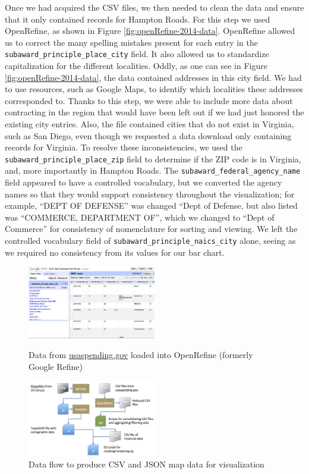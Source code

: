 \documentclass[10pt,journal,compsoc]{IEEEtran}
\begin{document}
Once we had acquired the CSV files, we then needed to clean the data and ensure that it only contained records for Hampton Roads.  For this step we used OpenRefine, as shown in Figure \ref{fig:openRefine-2014-data}.  OpenRefine allowed us to correct the many spelling mistakes present for each entry in the {\tt subaward\_principle\_place\_city} field.  It also allowed us to standardize capitalization for the different localities.  Oddly, as one can see in Figure \ref{fig:openRefine-2014-data}, the data contained addresses in this city field.  We had to use resources, such as Google Maps, to identify which localities these addresses corresponded to.  Thanks to this step, we were able to include more data about contracting in the region that would have been left out if we had just honored the existing city entries.  Also, the file contained cities that do not exist in Virginia, such as San Diego, even though we requested a data download only containing records for Virginia.  To resolve these inconsistencies, we used the {\tt subaward\_principle\_place\_zip} field to determine if the ZIP code is in Virginia, and, more importantly in Hampton Roads.  The {\tt subaward\_federal\_agency\_name} field appeared to have a controlled vocabulary, but we converted the agency names so that they would support consistency throughout the visualization; for example, ``DEPT OF DEFENSE'' was changed ``Dept of Defense, but also listed was ``COMMERCE, DEPARTMENT OF'', which we changed to ``Dept of Commerce'' for consistency of nomenclature for sorting and viewing.  We left the controlled vocabulary field of {\tt subaward\_principle\_naics\_city} alone, seeing as we required no consistency from its values for our bar chart.


\begin{figure}[htbp]
	\centering
	\includegraphics[width=0.5\textwidth]{images/openRefine-2014-data.png}
	\caption{Data from \protect\url{usaspending.gov} loaded into OpenRefine (formerly Google Refine)}
	\label{fig:openRefine-2014-data}	

	\vspace{3em}

	\centering
	\includegraphics[width=0.5\textwidth]{images/data-flow.png}
	\caption{Data flow to produce CSV and JSON map data for visualization}
	\label{fig:data-flow}	
\end{figure}
\end{document}
